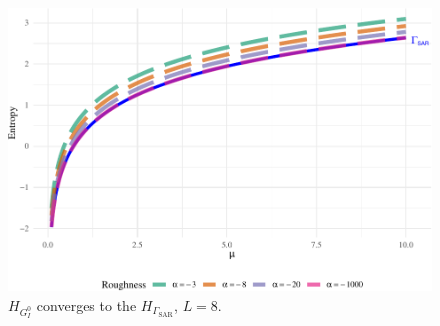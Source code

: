 \documentclass[aspectratio=1610,10pt]{beamer}
\begin{document}
\begin{frame}
\begin{columns}[T,onlytextwidth]
    
\begin{column}{.48\textwidth}\vspace{-0.5cm}
		     \begin{block}{} 
		\justifying
				\begin{figure}[H] 
         \centering
         \includegraphics[scale=0.45]{./Figures/Plot_GI0_to_gamma1-1} 
        \caption*{$H_{ G_I^0}$ converges to the $H_{\Gamma_{\text{SAR}}}$, $L=8$.}
    \end{figure}
\end{block}\vspace{2.8cm}
    \end{column}
\end{columns}\vspace{0.2cm}
       

\end{frame} 
\end{document}
